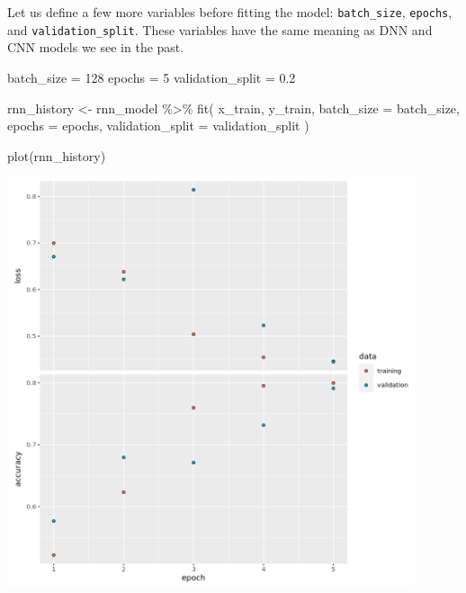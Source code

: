 \documentclass[
  12pt,
]{krantz}
\makeatletter
\newenvironment{Shaded}{\begin{snugshade}}{\end{snugshade}}
\newcommand{\AttributeTok}[1]{\textcolor[rgb]{0.61,0.61,0.61}{#1}}
\newcommand{\DecValTok}[1]{\textcolor[rgb]{0.06,0.06,0.06}{#1}}
\newcommand{\FloatTok}[1]{\textcolor[rgb]{0.06,0.06,0.06}{#1}}
\newcommand{\FunctionTok}[1]{\textcolor[rgb]{0,0,0}{#1}}
\newcommand{\NormalTok}[1]{#1}
\newcommand{\OtherTok}[1]{\textcolor[rgb]{0.37,0.37,0.37}{#1}}
\newcommand{\SpecialCharTok}[1]{\textcolor[rgb]{0,0,0}{#1}}
\newenvironment{kframe}{%
\medskip{}
\setlength{\fboxsep}{.8em}
 \def\at@end@of@kframe{}%
 \ifinner\ifhmode%
  \def\at@end@of@kframe{\end{minipage}}%
  \begin{minipage}{\columnwidth}%
 \fi\fi%
 \def\FrameCommand##1{\hskip\@totalleftmargin \hskip-\fboxsep
 \colorbox{shadecolor}{##1}\hskip-\fboxsep
     \hskip-\linewidth \hskip-\@totalleftmargin \hskip\columnwidth}%
 \MakeFramed {\advance\hsize-\width
   \@totalleftmargin\z@ \linewidth\hsize
   \@setminipage}}%
 {\par\unskip\endMakeFramed%
 \at@end@of@kframe}
\renewenvironment{Shaded}{\begin{kframe}}{\end{kframe}}
\makeatother
\begin{document}
Let us define a few more variables before fitting the model: \texttt{batch\_size}, \texttt{epochs}, and \texttt{validation\_split}. These variables have the same meaning as DNN and CNN models we see in the past.

\begin{Shaded}
\begin{Highlighting}[]
\NormalTok{batch\_size }\OtherTok{=} \DecValTok{128}
\NormalTok{epochs }\OtherTok{=} \DecValTok{5}
\NormalTok{validation\_split }\OtherTok{=} \FloatTok{0.2}

\NormalTok{rnn\_history }\OtherTok{\textless{}{-}}\NormalTok{ rnn\_model }\SpecialCharTok{\%\textgreater{}\%} \FunctionTok{fit}\NormalTok{(}
\NormalTok{  x\_train, y\_train,}
  \AttributeTok{batch\_size =}\NormalTok{ batch\_size,}
  \AttributeTok{epochs =}\NormalTok{ epochs,}
  \AttributeTok{validation\_split =}\NormalTok{ validation\_split}
\NormalTok{)}
\end{Highlighting}
\end{Shaded}

\begin{Shaded}
\begin{Highlighting}[]
\FunctionTok{plot}\NormalTok{(rnn\_history)}
\end{Highlighting}
\end{Shaded}

\includegraphics[width=0.9\textwidth,height=\textheight]{images/rnnhandson1.png}
\end{document}
